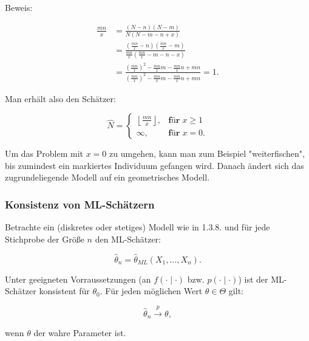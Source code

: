 \documentclass[10pt]{article}
\newcommand{\FZV}{X_1, \ldots, X_n} %
\newcommand{\KW}{\overset{p} \longrightarrow} %
\newenvironment{BSP}[1][]
{\begin{Beispiel}[frametitle=#1]}{\end{Beispiel}}
\begin{document}
\begin{BSP}[Beispiel 1.3.9 (Schätzung der Populationsgröße mit der Capture/Recapture-Methode)]
		Beweis:
		
		\begin{equation*}
			\begin{split}
				\frac{mn}{x} &= \frac{(N-n)(N-m)}{N(N-m-n+x)}\\  
				&= \frac{\left(\frac{mn}{x}-n\right)\left(\frac{mn}{x} -m\right)}{\frac{mn}{x}\left(\frac{mn}{x}-m-n-x\right)}\\
				&= \frac{\left(\frac{mn}{x}\right)^2 -\frac{mn}{x}m -\frac{mn}{x}n +mn} {\left(\frac{mn}{x}\right)^2 - \frac{mn}{x}m -\frac{mn}{x}n + mn} =1.
			\end{split}
		\end{equation*}
		
		Man erhält also den Schätzer:
		
		\begin{equation*}
			\hat{N} = 
			\begin{cases}
				\left\lfloor \frac{mn}{x} \right\rfloor, &\textbf{für} \; x \geq 1 \\
				\infty,  &\textbf{für} \; x =0.
			\end{cases}
		\end{equation*}
		
		Um das Problem mit $x=0$ zu umgehen, kann man zum Beispiel "weiterfischen", bis zumindest ein markiertes Individuum gefangen wird. Danach ändert sich das zugrundeliegende Modell auf ein geometrisches Modell. 
	\end{BSP}
	
	\subsubsection{Konsistenz von ML-Schätzern}
	
	Betrachte ein (diskretes oder stetiges) Modell wie in 1.3.8. und für jede Stichprobe der Größe $n$ den ML-Schätzer:
	
	\begin{equation*}
		\hat{\theta}_n = \hat{\theta}_{ML}(\FZV).
	\end{equation*}
	
	\begin{Satz}
	Unter geeigneten Vorraussetzungen (an $f(\cdot \mid \cdot)$ bzw. $p(\cdot \mid \cdot)$) ist der ML-Schätzer konsistent für $\theta_0$. Für jeden möglichen Wert $\theta \in \Theta$ gilt:
	
	\begin{equation*}
		\hat{\theta}_n \KW \theta,
	\end{equation*}
	
	wenn $\theta$ der wahre Parameter ist. 
	\end{Satz}
	
\end{document}
